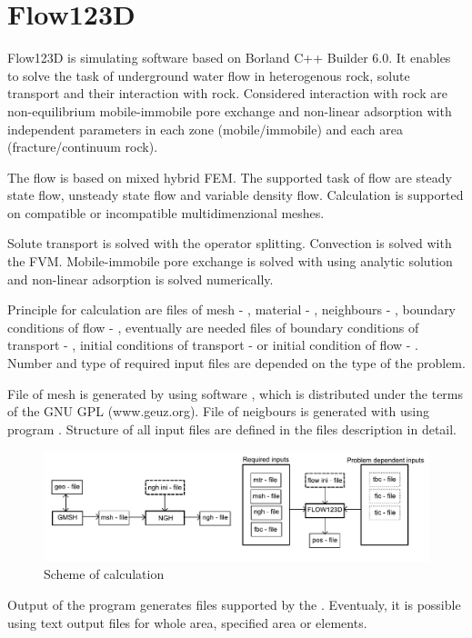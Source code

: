 
\setcounter{page}{2}

\section*{Flow123D}

Flow123D is simulating software based on Borland C++ Builder 6.0. It enables to solve the task of underground water flow in heterogenous rock, solute transport and their interaction with rock. Considered interaction with rock are non-equilibrium mobile-immobile pore exchange and non-linear adsorption with independent parameters in each zone (mobile/immobile) and each area (fracture/continuum rock).

The flow is based on mixed hybrid FEM. The supported task of flow are steady state flow, unsteady state flow and variable density flow. Calculation is supported on compatible or incompatible multidimenzional meshes. 

Solute transport is solved with the operator splitting.  Convection is solved with the FVM. Mobile-immobile pore exchange is solved with using analytic solution and non-linear adsorption is solved numerically.

Principle for calculation are files of mesh - , material - , neighbours - , boundary conditions of flow - , eventually are needed files of boundary conditions of transport - , initial conditions of transport -  or initial condition of flow - . Number and type of required input files are depended on the type of the problem.

File of  mesh is generated by using software , which is distributed under the terms of the GNU GPL (www.geuz.org). File of neigbours is generated with using program . Structure of all input files are defined in the files description in detail. 

 \begin{figure}[h]
    \begin{center}
      \includegraphics[scale=0.7]{schema.pdf} %
      \caption{Scheme of calculation}
      \label{obr3}
    \end{center}
  \end{figure}

Output of the program generates  files supported by the . Eventualy, it is possible using text output files for whole area, specified area or elements. 
